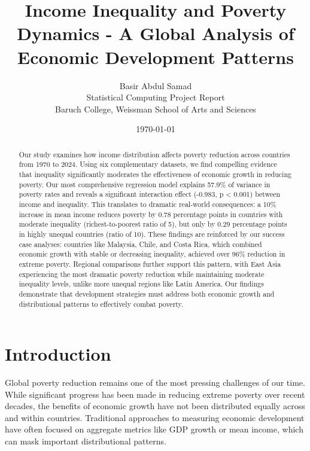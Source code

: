 \documentclass[12pt,a4paper]{article}
\begin{document}
\title{Income Inequality and Poverty Dynamics - A Global Analysis of Economic Development Patterns}
\author{Basir Abdul Samad \\
Statistical Computing Project Report \\
Baruch College, Weissman School of Arts and Sciences}
\date{\today}

\maketitle

\begin{abstract}
Our study examines how income distribution affects poverty reduction across countries from 1970 to 2024. Using six complementary datasets, we find compelling evidence that inequality significantly moderates the effectiveness of economic growth in reducing poverty. Our most comprehensive regression model explains 57.9\% of variance in poverty rates and reveals a significant interaction effect (-0.983, p < 0.001) between income and inequality. This translates to dramatic real-world consequences: a 10\% increase in mean income reduces poverty by 0.78 percentage points in countries with moderate inequality (richest-to-poorest ratio of 5), but only by 0.29 percentage points in highly unequal countries (ratio of 10). These findings are reinforced by our success case analyses: countries like Malaysia, Chile, and Costa Rica, which combined economic growth with stable or decreasing inequality, achieved over 96\% reduction in extreme poverty. Regional comparisons further support this pattern, with East Asia experiencing the most dramatic poverty reduction while maintaining moderate inequality levels, unlike more unequal regions like Latin America. Our findings demonstrate that development strategies must address both economic growth and distributional patterns to effectively combat poverty.
\end{abstract}

\tableofcontents
\listoffigures
\newpage

\section{Introduction}\label{sec:introduction}
Global poverty reduction remains one of the most pressing challenges of our time. While significant progress has been made in reducing extreme poverty over recent decades, the benefits of economic growth have not been distributed equally across and within countries. Traditional approaches to measuring economic development have often focused on aggregate metrics like GDP growth or mean income, which can mask important distributional patterns.
\end{document}
